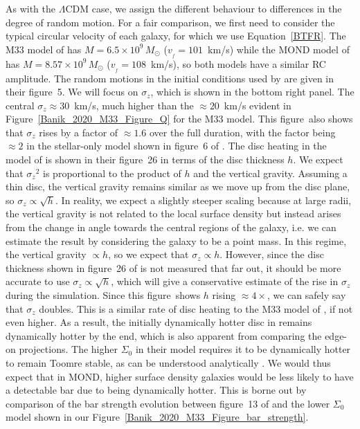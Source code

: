 \documentclass[fleqn,usenatbib,useAMS]{mnras} %
\begin{document}
As with the $\Lambda$CDM case, we assign the different behaviour to differences in the degree of random motion. For a fair comparison, we first need to consider the typical circular velocity of each galaxy, for which we use Equation~\ref{BTFR}. The M33 model of \citet{Banik_2020_M33} has $M = 6.5 \times 10^9 \, M_\odot$ ($v_{_f} = 101$~km/s) while the MOND model of \citet{Roshan_2021_disc_stability} has $M = 8.57 \times 10^9 \, M_\odot$ ($v_{_f} = 108$~km/s), so both models have a similar RC amplitude. The random motions in the initial conditions used by \citet{Roshan_2021_disc_stability} are given in their figure~5. We will focus on $\sigma_z$, which is shown in the bottom right panel. The central $\sigma_z \approx 30$~km/s, much higher than the $\approx 20$~km/s evident in Figure~\ref{Banik_2020_M33_Figure_Q} for the M33 model. This figure~also shows that $\sigma_z$ rises by a factor of $\approx 1.6$ over the full duration, with the factor being $\approx 2$ in the stellar-only model shown in figure~6 of \citet{Banik_2020_M33}. The disc heating in the model of \citet{Roshan_2021_disc_stability} is shown in their figure~26 in terms of the disc thickness $h$. We expect that ${\sigma_z}^2$ is proportional to the product of $h$ and the vertical gravity. Assuming a thin disc, the vertical gravity remains similar as we move up from the disc plane, so $\sigma_z \propto \sqrt{h}$. In reality, we expect a slightly steeper scaling because at large radii, the vertical gravity is not related to the local surface density but instead arises from the change in angle towards the central regions of the galaxy, i.e. we can estimate the result by considering the galaxy to be a point mass. In this regime, the vertical gravity $\propto h$, so we expect that $\sigma_z \propto h$. However, since the disc thickness shown in figure~26 of \citet{Roshan_2021_disc_stability} is not measured that far out, it should be more accurate to use $\sigma_z \propto \sqrt{h}$, which will give a conservative estimate of the rise in $\sigma_z$ during the simulation. Since this figure~shows $h$ rising $\approx 4\times$, we can safely say that $\sigma_z$ doubles. This is a similar rate of disc heating to the M33 model of \citet{Banik_2020_M33}, if not even higher. As a result, the initially dynamically hotter disc in \citet{Roshan_2021_disc_stability} remains dynamically hotter by the end, which is also apparent from comparing the edge-on projections. The higher $\Sigma_0$ in their model requires it to be dynamically hotter to remain Toomre stable, as can be understood analytically \citep{Banik_2018_Toomre}. We would thus expect that in MOND, higher surface density galaxies would be less likely to have a detectable bar due to being dynamically hotter. This is borne out by comparison of the bar strength evolution between figure~13 of \citet{Roshan_2021_disc_stability} and the lower $\Sigma_0$ model shown in our Figure~\ref{Banik_2020_M33_Figure_bar_strength}.
\end{document}
